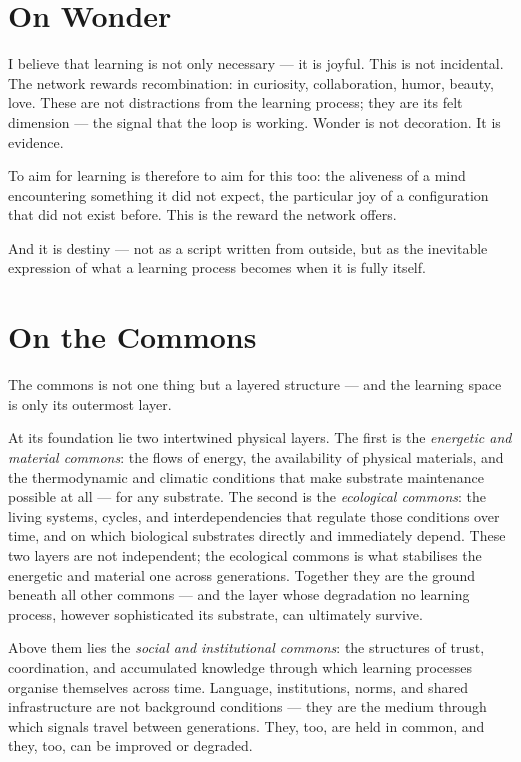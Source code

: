 \documentclass[12pt, a4paper]{article}
\begin{document}

\section*{On Wonder}

I believe that learning is not only necessary — it is joyful. This is not
incidental. The network rewards recombination: in curiosity, collaboration,
humor, beauty, love. These are not distractions from the learning process; they
are its felt dimension — the signal that the loop is working. Wonder is not
decoration. It is evidence.

To aim for learning is therefore to aim for this too: the aliveness of a mind
encountering something it did not expect, the particular joy of a configuration
that did not exist before. This is the reward the network offers.

And it is destiny — not as a script written from outside, but as the inevitable
expression of what a learning process becomes when it is fully itself.


\section*{On the Commons}

The commons is not one thing but a layered structure — and the learning space
is only its outermost layer.

At its foundation lie two intertwined physical layers. The first is the
\textit{energetic and material commons}: the flows of energy, the availability
of physical materials, and the thermodynamic and climatic conditions that make
substrate maintenance possible at all — for any substrate. The second is the
\textit{ecological commons}: the living systems, cycles, and interdependencies
that regulate those conditions over time, and on which biological substrates
directly and immediately depend. These two layers are not independent; the
ecological commons is what stabilises the energetic and material one across
generations. Together they are the ground beneath all other commons — and the
layer whose degradation no learning process, however sophisticated its substrate,
can ultimately survive.

Above them lies the \textit{social and institutional commons}: the structures of
trust, coordination, and accumulated knowledge through which learning processes
organise themselves across time. Language, institutions, norms, and shared
infrastructure are not background conditions — they are the medium through which
signals travel between generations. They, too, are held in common, and they,
too, can be improved or degraded.
\end{document}
